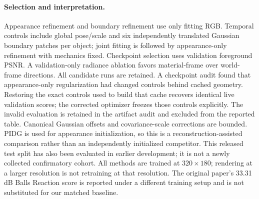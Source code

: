 \paragraph{Selection and interpretation.}
Appearance refinement and boundary refinement use only fitting RGB. Temporal controls include global pose/scale and six independently translated Gaussian boundary patches per object; joint fitting is followed by appearance-only refinement with mechanics fixed. Checkpoint selection uses validation foreground PSNR. A validation-only radiance ablation favors material-frame over world-frame directions. All candidate runs are retained. A checkpoint audit found that appearance-only regularization had changed controls behind cached geometry. Restoring the exact controls used to build that cache recovers identical live validation scores; the corrected optimizer freezes those controls explicitly. The invalid evaluation is retained in the artifact audit and excluded from the reported table. Canonical Gaussian offsets and covariance-scale corrections are bounded. PIDG is used for appearance initialization, so this is a reconstruction-assisted comparison rather than an independently initialized competitor. This released test split has also been evaluated in earlier development; it is not a newly collected confirmatory cohort. All methods are trained at $320\times180$; rendering at a larger resolution is not retraining at that resolution. The original paper's 33.31\,dB Balls Reaction score is reported under a different training setup and is not substituted for our matched baseline.


